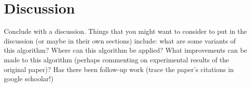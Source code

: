 \documentclass[11pt]{article}
\begin{document}
\section{Discussion}
Conclude with a discussion.  Things that you might want to consider to put in 
the discussion (or maybe in their own sections) include: what are some variants 
of this algorithm? Where can this algorithm be applied?  What improvements can 
be made to this algorithm (perhaps commenting on experimental results of the 
original paper)?  Has there been follow-up work (trace the paper's citations in 
google schoolar!)
\end{document}
